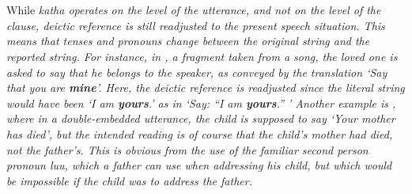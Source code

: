  \\ 

 \\




While \em katha \em operates on the level of the utterance, and not on the level of the clause, deictic reference is still readjusted to the present speech situation. This means that tenses and pronouns change between the original string and the reported string. For instance, in , a fragment taken from a song, the loved one is asked to say that he belongs to the speaker, as conveyed by the translation `Say that you are \textbf{mine}'. Here, the deictic reference is readjusted since the literal string would have been `I am \textbf{yours}.' as in `Say: ``I am \textbf{yours}.'' ' Another example is , where in a double-embedded utterance, the child is supposed to say `Your mother has died', but the intended reading is of course that the child's mother had died, not the father's. This is obvious from the use of the familiar second person pronoun \em luu\em, which a father can use when addressing his child, but which would be impossible if the child was to address the father.

 \\

